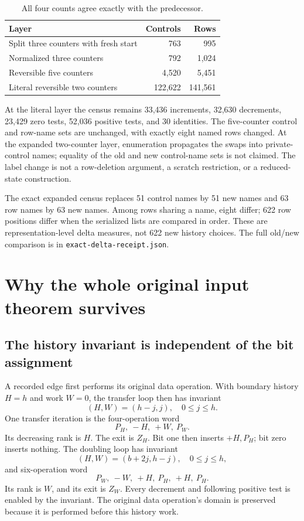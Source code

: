 \documentclass[11pt,a4paper]{article}
\numberwithin{equation}{section}
\newcommand{\code}[1]{\texttt{\small #1}}
\begin{document}
\begin{table}[htbp]
\centering
\begin{tabular}{@{}lrr@{}}
\toprule
Layer & Controls & Rows\\
\midrule
Split three counters with fresh start & 763 & 995\\
Normalized three counters & 792 & 1,024\\
Reversible five counters & 4,520 & 5,451\\
Literal reversible two counters & 122,622 & 141,561\\
\bottomrule
\end{tabular}
\caption{All four counts agree exactly with the predecessor.}
\end{table}

At the literal layer the census remains 33,436 increments, 32,630 decrements,
23,429 zero tests, 52,036 positive tests, and 30 identities. The five-counter control and row-name sets are unchanged, with exactly eight
named rows changed. At the expanded two-counter layer, enumeration propagates
the swaps into private-control names; equality of the old and new control-name
sets is not claimed. The label change
is not a row-deletion argument, a scratch restriction, or a reduced-state
construction.

The exact expanded census replaces 51 control names by 51 new names and
63 row names by 63 new names. Among rows sharing a name, eight differ;
622 row positions differ when the serialized lists are compared in order.
These are representation-level delta measures, not 622 new history choices.
The full old/new comparison is in \code{exact-delta-receipt.json}.

\section{Why the whole original input theorem survives}
\label{fpa:st:sec:inherit}
\subsection{The history invariant is independent of the bit assignment}
A recorded edge first performs its original data operation. With boundary
history $H=h$ and work $W=0$, the transfer loop then has invariant
\[
 (H,W)=(h-j,j),\quad 0\leq j\leq h.
\]
One transfer iteration is the four-operation word
\[
 P_H,\ -H,\ +W,\ P_W.
\]
Its decreasing rank is $H$. The exit is $Z_H$. Bit one then inserts
$+H,P_H$; bit zero inserts nothing. The doubling loop has invariant
\[
 (H,W)=(b+2j,h-j),\quad 0\leq j\leq h,
\]
and six-operation word
\[
 P_W,\ -W,\ +H,\ P_H,\ +H,\ P_H.
\]
Its rank is $W$, and its exit is $Z_W$. Every decrement and following
positive test is enabled by the invariant. The original data operation's
domain is preserved because it is performed before this history work.
\end{document}
